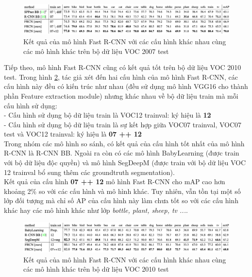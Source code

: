 {        \begin{figure}[H]
            \centering
            \includegraphics[width=15cm] {images/fast_rcnn_results_1}
            \caption{Kết quả của mô hình Fast R-CNN với các cấu hình khác nhau cùng các mô hình khác trên bộ dữ liệu VOC 2007 test}
            \label{fig:fast_rcnn_results_1}
        \end{figure}

        \noindent
        Tiếp theo, mô hình Fast R-CNN cũng có kết quả tốt trên bộ dữ liệu VOC 2010 test.
        Trong hình \ref{fig:fast_rcnn_results_2}, tác giả xét đến hai cấu hình của mô hình Fast R-CNN, các cấu hình này đều có kiến trúc như nhau (đều sử dụng mô hình VGG16 cho thành phần Feature extraction module) nhưng khác nhau về bộ dữ liệu train mà mỗi cấu hình sử dụng: \\
        - Cấu hình sử dụng bộ dữ liệu train là VOC12 trainval: ký hiệu là \textbf{12} \\
        - Cấu hình sử dụng bộ dữ liệu train là sự kết hợp giữa VOC07 trainval, VOC07 test và VOC12 trainval: ký hiệu là \textbf{07 ++ 12} \\
        Trong nhóm các mô hình so sánh, có kết quả của cấu hình tốt nhất của mô hình R-CNN là R-CNN BB.
        Ngoài ra còn có các mô hình BabyLearning (được train với bộ dữ liệu độc quyền) và mô hình SegDeepM (được train với bộ dữ liệu VOC 12 trainval bổ sung thêm các groundtruth segmentation). \\
        Kết quả của cấu hình \textbf{07 ++ 12} mô hình Fast R-CNN cho mAP cao hơn khoảng 2\% so với các cấu hình và mô hình khác.
        Tuy nhiên, vẫn tồn tại một số lớp đối tượng mà chỉ số AP của cấu hình này làm chưa tốt so với các cấu hình khác hay các mô hình khác như lớp \textit{bottle, plant, sheep, tv ...}.

        \begin{figure}[H]
            \centering
            \includegraphics[width=15cm] {images/fast_rcnn_results_2}
            \caption{Kết quả của mô hình Fast R-CNN với các cấu hình khác nhau cùng các mô hình khác trên bộ dữ liệu VOC 2010 test}
            \label{fig:fast_rcnn_results_2}
        \end{figure}

}
